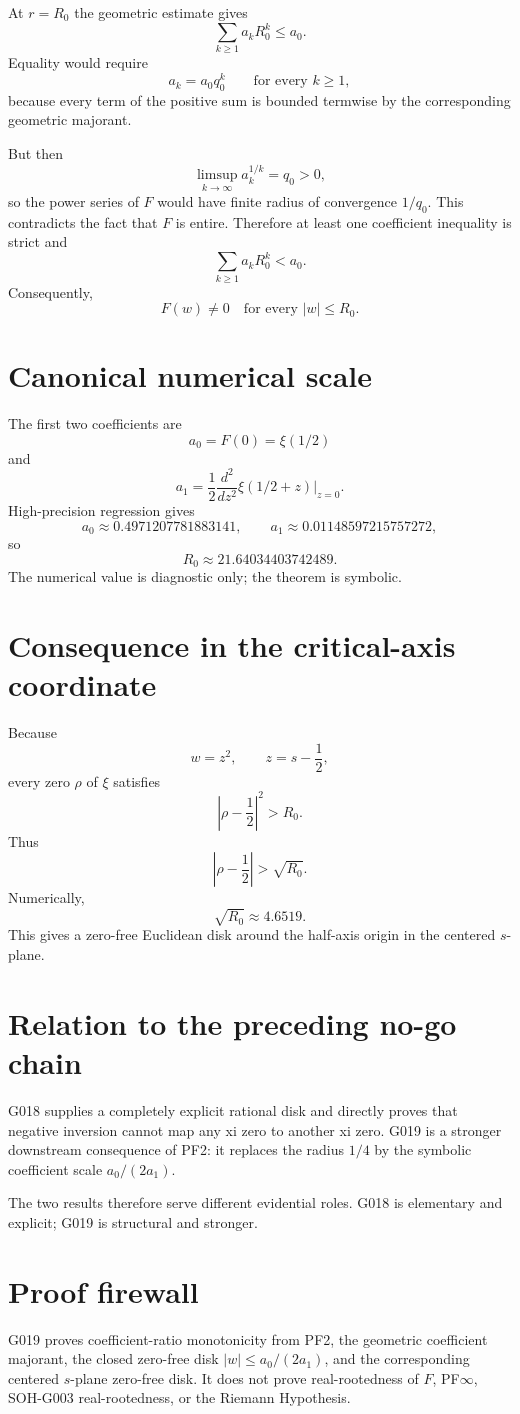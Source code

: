 At $r=R_0$ the geometric estimate gives
\[
 \sum_{k\ge1}a_kR_0^k\le a_0.
\]
Equality would require
\[
 a_k=a_0q_0^k
 \qquad\text{for every }k\ge1,
\]
because every term of the positive sum is bounded termwise by the corresponding geometric majorant.

But then
\[
 \limsup_{k\to\infty}a_k^{1/k}=q_0>0,
\]
so the power series of $F$ would have finite radius of convergence $1/q_0$. This contradicts the fact that $F$ is entire. Therefore at least one coefficient inequality is strict and
\[
 \sum_{k\ge1}a_kR_0^k<a_0.
\]
Consequently,
\[
 \boxed{
 F(w)\ne0\quad\text{for every }|w|\le R_0.}
\]

\section{Canonical numerical scale}

The first two coefficients are
\[
 a_0=F(0)=\xi(1/2)
\]
and
\[
 a_1=\frac12\frac{d^2}{dz^2}\xi(1/2+z)\bigg|_{z=0}.
\]
High-precision regression gives
\[
 a_0\approx0.4971207781883141,
 \qquad
 a_1\approx0.01148597215757272,
\]
so
\[
 \boxed{R_0\approx21.64034403742489.}
\]
The numerical value is diagnostic only; the theorem is symbolic.

\section{Consequence in the critical-axis coordinate}

Because
\[
 w=z^2,
 \qquad z=s-\frac12,
\]
every zero $\rho$ of $\xi$ satisfies
\[
 \left|\rho-\frac12\right|^2>R_0.
\]
Thus
\[
 \boxed{
 \left|\rho-\frac12\right|>\sqrt{R_0}.}
\]
Numerically,
\[
 \sqrt{R_0}\approx4.6519.
\]
This gives a zero-free Euclidean disk around the half-axis origin in the centered $s$-plane.

\section{Relation to the preceding no-go chain}

G018 supplies a completely explicit rational disk and directly proves that negative inversion cannot map any xi zero to another xi zero. G019 is a stronger downstream consequence of PF2: it replaces the radius $1/4$ by the symbolic coefficient scale $a_0/(2a_1)$.

The two results therefore serve different evidential roles. G018 is elementary and explicit; G019 is structural and stronger.

\section{Proof firewall}

G019 proves coefficient-ratio monotonicity from PF2, the geometric coefficient majorant, the closed zero-free disk $|w|\le a_0/(2a_1)$, and the corresponding centered $s$-plane zero-free disk. It does not prove real-rootedness of $F$, PF$\infty$, SOH-G003 real-rootedness, or the Riemann Hypothesis.
